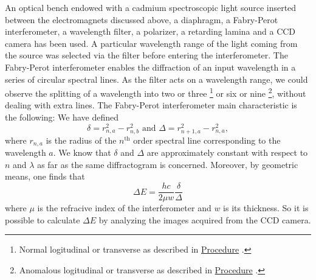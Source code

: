 \documentclass[a4paper,12pt,abstracton]{scrartcl}
\begin{document}
An optical bench endowed with a cadmium spectroscopic light source inserted between the electromagnets discussed above, a diaphragm, a Fabry-Perot interferometer, a wavelength filter, a polarizer, a retarding lamina and a CCD camera has been used. A particular wavelength range  of the light coming from the source was selected via the filter before entering the interferometer. The Fabry-Perot interferometer enables the diffraction of an input wavelength in a series of circular spectral lines. As the filter acts on a wavelength range, we could observe the splitting of a wavelength into two or three \footnote{Normal logitudinal or transverse as described in \hyperref[subsec:procedure]{Procedure} .} or six or nine \footnote{Anomalous logitudinal or transverse as described in \hyperref[subsec:procedure]{Procedure} .}, without dealing with extra lines. The Fabry-Perot interferometer main characteristic is the following:\newline
We have defined $$\delta = r^2_{n,a}-r^2_{n,b} \text{ and }\Delta = r^2_{n+1,a}-r^2_{n,a},$$ where $r_{n,a}$ is the radius of the $n^{\text{th}}$ order spectral line corresponding to the wavelength $a$. We know that $\delta$ and $\Delta$ are approximately constant with respect to $n$ and $\lambda$ as far as the same diffractogram is concerned. Moreover, by geometric means, one finds that 
\begin{equation} \label{eq:1}
\Delta E  = \frac{hc}{2\mu w} \frac{\delta}{\Delta}
\end{equation}
 where $\mu$ is the refracive index of the interferometer and $w$ is its thickness. So it is possible to calculate $\Delta E$ by analyzing the images acquired from the CCD camera.
\end{document}
